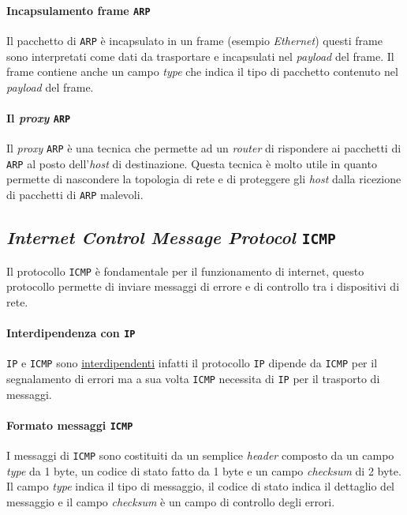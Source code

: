         \paragraph{Incapsulamento frame \texttt{ARP}} Il pacchetto di \texttt{ARP} è incapsulato in un frame (esempio \textit{Ethernet}) questi frame sono interpretati come dati da trasportare e incapsulati nel \textit{payload} del frame. Il frame contiene anche un campo \textit{type} che indica il tipo di pacchetto contenuto nel \textit{payload} del frame.
        \paragraph{Il \textit{proxy} \texttt{ARP}} Il \textit{proxy} \texttt{ARP} è una tecnica che permette ad un \textit{router} di rispondere ai pacchetti di \texttt{ARP} al posto dell'\textit{host} di destinazione. Questa tecnica è molto utile in quanto permette di nascondere la topologia di rete e di proteggere gli \textit{host} dalla ricezione di pacchetti di \texttt{ARP} malevoli.
    \subsection{\textit{Internet Control Message Protocol} \texttt{ICMP}}
        Il protocollo \texttt{ICMP} è fondamentale per il funzionamento di internet, questo protocollo permette di inviare messaggi di errore e di controllo tra i dispositivi di rete.
        \paragraph{Interdipendenza con \texttt{IP}}\texttt{IP} e \texttt{ICMP} sono \underline{interdipendenti} infatti il protocollo \texttt{IP} dipende da \texttt{ICMP} per il segnalamento di errori ma a sua volta \texttt{ICMP} necessita di \texttt{IP} per il trasporto di messaggi.
        \paragraph{Formato messaggi \texttt{ICMP}} I messaggi di \texttt{ICMP} sono costituiti da un semplice \textit{header} composto da un campo \textit{type} da 1 byte, un codice di stato fatto da 1 byte e un campo \textit{checksum} di 2 byte. Il campo \textit{type} indica il tipo di messaggio, il codice di stato indica il dettaglio del messaggio e il campo \textit{checksum} è un campo di controllo degli errori.
